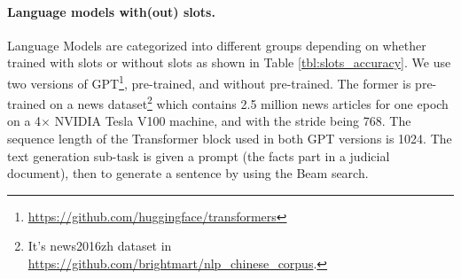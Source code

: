 \documentclass{article}
\begin{document}
\paragraph{Language models with(out) slots.} 
Language Models are categorized into different groups depending on whether trained with slots or without slots as shown in Table \ref{tbl:slots_accuracy}. 
We use two versions of GPT\footnote{\url{https://github.com/huggingface/transformers}}, pre-trained, and without pre-trained. 
The former is pre-trained on a news dataset\footnote{It's news2016zh dataset in \url{https://github.com/brightmart/nlp_chinese_corpus}.} which contains 2.5 million news articles for one epoch on a 4$\times$ NVIDIA Tesla V100 machine, and with the stride being 768. 
The sequence length of the Transformer block used in both GPT versions is 1024.
The text generation sub-task is given a prompt (the facts part in a judicial document), then to generate a sentence by using the Beam search. 

\begin{table}[]
\caption{The F score of predicting law article slots (Type B slots) of different language models, on test dataset.}
\label{tbl:slots_accuracy}
\end{table}
\end{document}

